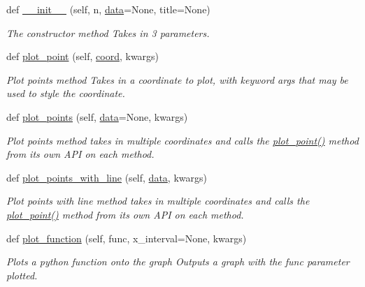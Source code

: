 \begin{DoxyCompactItemize}
\item 
def \hyperlink{classxy_chart_1_1_graph_1_1_graph_a3abfa63d07c2b2ef5de027d332f56b8b}{\+\_\+\+\_\+init\+\_\+\+\_\+} (self, n, \hyperlink{classxy_chart_1_1_graph_1_1_graph_a7b72c0a9156bafb64d165bed836dfa84}{data}=None, title=None)
\begin{DoxyCompactList}\small\item\em The constructor method Takes in 3 parameters. \end{DoxyCompactList}\item 
def \hyperlink{classxy_chart_1_1_graph_1_1_graph_a5720fad665cab6827e8c0b2bebcf4b49}{plot\+\_\+point} (self, \hyperlink{namespacexy_chart_1_1_graph_a3e2c4e3989f17aadcd35098ef933eab5}{coord}, kwargs)
\begin{DoxyCompactList}\small\item\em Plot points method Takes in a coordinate to plot, with keyword args that may be used to style the coordinate. \end{DoxyCompactList}\item 
def \hyperlink{classxy_chart_1_1_graph_1_1_graph_abe2443b75425bb20756edb1c5d7a5f9e}{plot\+\_\+points} (self, \hyperlink{classxy_chart_1_1_graph_1_1_graph_a7b72c0a9156bafb64d165bed836dfa84}{data}=None, kwargs)
\begin{DoxyCompactList}\small\item\em Plot points method takes in multiple coordinates and calls the \hyperlink{classxy_chart_1_1_graph_1_1_graph_a5720fad665cab6827e8c0b2bebcf4b49}{plot\+\_\+point()} method from its own A\+PI on each method. \end{DoxyCompactList}\item 
def \hyperlink{classxy_chart_1_1_graph_1_1_graph_a03674dbb283ff19949d1d79c68d80c7f}{plot\+\_\+points\+\_\+with\+\_\+line} (self, \hyperlink{classxy_chart_1_1_graph_1_1_graph_a7b72c0a9156bafb64d165bed836dfa84}{data}, kwargs)
\begin{DoxyCompactList}\small\item\em Plot points with line method takes in multiple coordinates and calls the \hyperlink{classxy_chart_1_1_graph_1_1_graph_a5720fad665cab6827e8c0b2bebcf4b49}{plot\+\_\+point()} method from its own A\+PI on each method. \end{DoxyCompactList}\item 
def \hyperlink{classxy_chart_1_1_graph_1_1_graph_ac9d04bd8df2a53b5b53674b1af092ec2}{plot\+\_\+function} (self, func, x\+\_\+interval=None, kwargs)
\begin{DoxyCompactList}\small\item\em Plots a python function onto the graph Outputs a graph with the func parameter plotted. \end{DoxyCompactList}\end{DoxyCompactItemize}
